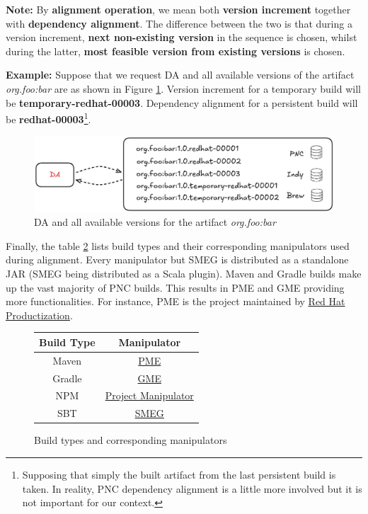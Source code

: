 \documentclass[../main.tex]{subfiles}
\begin{document}
\textbf{Note:} By \textbf{alignment operation}, we mean both \textbf{version increment} together with \textbf{dependency alignment}. The difference between the two is that during a version increment, \textbf{next non-existing version} in the sequence is chosen, whilst during the latter, \textbf{most feasible version from existing versions} is chosen.

\textbf{Example:} Suppose that we request DA and all available versions of the artifact \textit{org.foo:bar} are as shown in Figure \ref{fig:version-increment-vs-dependency-alignment}. Version increment for a temporary build will be \textbf{temporary-redhat-00003}. Dependency alignment for a persistent build will be \textbf{redhat-00003}\footnote{Supposing that simply the built artifact from the last persistent build is taken. In reality, PNC dependency alignment is a little more involved but it is not important for our context.}.

\begin{figure}
  \begin{center}
    \includegraphics[width=\textwidth]{images/version-increment-vs-dependency-alignment.png}
  \end{center}
  \caption{DA and all available versions for the artifact \textit{org.foo:bar}}
  \label{fig:version-increment-vs-dependency-alignment}
\end{figure}

Finally, the table \ref{table:build-types-and-manipulators} lists build types and their corresponding manipulators used during alignment. Every manipulator but SMEG is distributed as a standalone JAR (SMEG being distributed as a Scala plugin). Maven and Gradle builds make up the vast majority of PNC builds. This results in PME and GME providing more functionalities. For instance, PME is the project maintained by \href{https://github.com/release-engineering}{Red Hat Productization}.

\begin{figure}
    \begin{center}
    \begin{tabular}{ |c|c| }
    \hline
    Build Type & Manipulator \\
    \hline
    Maven & \href{https://github.com/release-engineering/pom-manipulation-ext}{PME} \\ 
    Gradle & \href{https://github.com/project-ncl/gradle-manipulator}{GME} \\ 
    NPM & \href{https://github.com/project-ncl/project-manipulator}{Project Manipulator} \\ 
    SBT & \href{https://github.com/project-ncl/smeg}{SMEG} \\
    \hline
    \end{tabular}
    \end{center}
    \caption{Build types and corresponding manipulators}
    \label{table:build-types-and-manipulators}
\end{figure}
\end{document}
